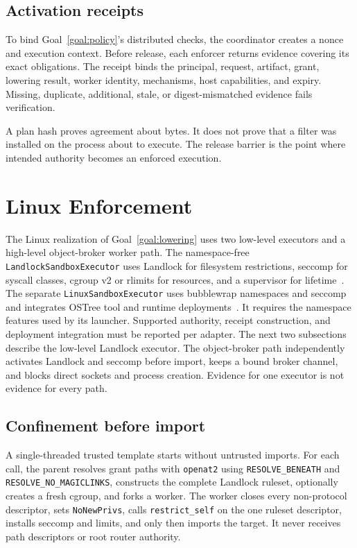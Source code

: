 \documentclass[letterpaper,twocolumn,10pt]{article}
\newcommand{\code}[1]{\texttt{#1}}
\begin{document}
\subsection{Activation receipts}
\label{sec:activation}

To bind Goal~\ref{goal:policy}'s distributed checks, the coordinator creates a
nonce and execution context. Before release, each
enforcer returns evidence covering its exact obligations. The receipt binds the
principal, request, artifact, grant, lowering result, worker identity,
mechanisms, host capabilities, and expiry. Missing, duplicate, additional,
stale, or digest-mismatched evidence fails verification.

A plan hash proves agreement about bytes. It does not prove that a filter was
installed on the process about to execute. The release barrier is the point
where intended authority becomes an enforced execution.

\section{Linux Enforcement}
\label{sec:linux}

The Linux realization of Goal~\ref{goal:lowering} uses two low-level executors
and a high-level object-broker worker path. The namespace-free
\code{LandlockSandboxExecutor} uses Landlock for filesystem restrictions,
seccomp for syscall classes, cgroup v2 or rlimits for resources, and a supervisor
for lifetime~\cite{landlock,seccomp}. The separate
\code{LinuxSandboxExecutor} uses bubblewrap namespaces and seccomp and
integrates OSTree tool and runtime deployments~\cite{bubblewrap}. It requires
the namespace features used by its launcher. Supported authority, receipt
construction, and deployment integration must be reported per adapter.
The next two subsections describe the low-level Landlock executor. The
object-broker path independently activates Landlock and seccomp before import,
keeps a bound broker channel, and blocks direct sockets and process creation.
Evidence for one executor is not evidence for every path.

\subsection{Confinement before import}

A single-threaded trusted template starts without untrusted imports. For each
call, the parent resolves grant paths with \code{openat2} using
\code{RESOLVE\_BENEATH} and \code{RESOLVE\_NO\_MAGICLINKS}, constructs the
complete Landlock ruleset, optionally creates a fresh cgroup, and forks a worker.
The worker closes every non-protocol descriptor, sets \code{NoNewPrivs}, calls
\code{restrict\_self} on the one ruleset descriptor, installs seccomp and
limits, and only then imports the target. It never receives path descriptors or
root router authority.
\end{document}
